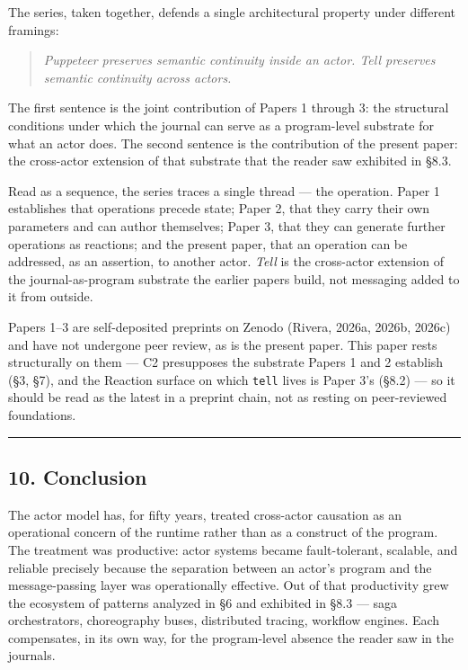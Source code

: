 \documentclass[
]{article}
\let\origtexttt\texttt%
\renewcommand{\texttt}[1]{\origtexttt{\seqsplit{#1}}}%
\let\texttt\origtexttt%
\begin{document}
The series, taken together, defends a single architectural property
under different framings:

\begin{quote}
\emph{Puppeteer preserves semantic continuity inside an actor. Tell
preserves semantic continuity across actors.}
\end{quote}

The first sentence is the joint contribution of Papers 1 through 3: the
structural conditions under which the journal can serve as a
program-level substrate for what an actor does. The second sentence is
the contribution of the present paper: the cross-actor extension of that
substrate that the reader saw exhibited in §8.3.

Read as a sequence, the series traces a single thread --- the operation.
Paper 1 establishes that operations precede state; Paper 2, that they
carry their own parameters and can author themselves; Paper 3, that they
can generate further operations as reactions; and the present paper,
that an operation can be addressed, as an assertion, to another actor.
\emph{Tell} is the cross-actor extension of the journal-as-program
substrate the earlier papers build, not messaging added to it from
outside.

Papers 1--3 are self-deposited preprints on Zenodo (Rivera, 2026a,
2026b, 2026c) and have not undergone peer review, as is the present
paper. This paper rests structurally on them --- C2 presupposes the
substrate Papers 1 and 2 establish (§3, §7), and the Reaction surface on
which \texttt{tell} lives is Paper 3's (§8.2) --- so it should be read
as the latest in a preprint chain, not as resting on peer-reviewed
foundations.

\begin{center}\rule{0.5\linewidth}{0.5pt}\end{center}

\subsection{10. Conclusion}\label{conclusion}

The actor model has, for fifty years, treated cross-actor causation as
an operational concern of the runtime rather than as a construct of the
program. The treatment was productive: actor systems became
fault-tolerant, scalable, and reliable precisely because the separation
between an actor's program and the message-passing layer was
operationally effective. Out of that productivity grew the ecosystem of
patterns analyzed in §6 and exhibited in §8.3 --- saga orchestrators,
choreography buses, distributed tracing, workflow engines. Each
compensates, in its own way, for the program-level absence the reader
saw in the journals.
\end{document}
